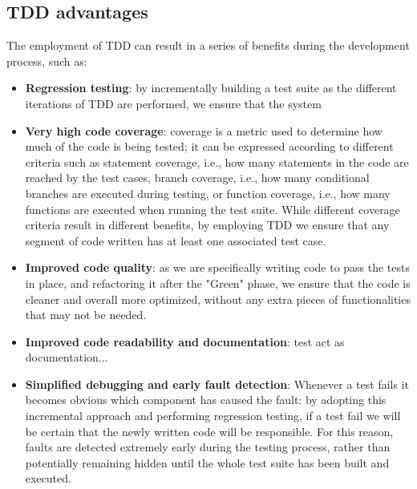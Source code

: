\subsection{TDD advantages}
The employment of TDD can result in a series of benefits during the development process, such as:
\begin{itemize}
    \item \textbf{Regression testing}: by incrementally building a test suite as the different iterations of TDD are performed, we ensure that the system  
    \item \textbf{Very high code coverage}: coverage is a metric used to determine how much of the code is being tested; it can be expressed according to different criteria such as statement coverage, i.e., how many statements in the code are reached by the test cases, branch coverage, i.e., how many conditional branches are executed during testing, or function coverage, i.e., how many functions are executed when running the test suite. While different coverage criteria result in different benefits, by employing TDD we ensure that any segment of code written has at least one associated test case.
    \item \textbf{Improved code quality}: as we are specifically writing code to pass the tests in place, and refactoring it after the "Green" phase, we ensure that the code is cleaner and overall more optimized, without any extra pieces of functionalities that may not be needed. 
    \item \textbf{Improved code readability and documentation}: test act as documentation...
    \item \textbf{Simplified debugging and early fault detection}: Whenever a test fails it becomes obvious which component has caused the fault: by adopting this incremental approach and performing regression testing, if a test fail we will be certain that the newly written code will be responsible. For this reason, faults are detected extremely early during the testing process, rather than potentially remaining hidden until the whole test suite has been built and executed.
\end{itemize}


